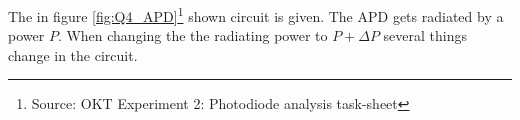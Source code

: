 %
% 
%
%
%
%
%
%
%
%
%
%
%
%

The in figure \ref{fig:Q4_APD}\footnote[1]{Source: OKT Experiment 2: Photodiode analysis task-sheet} shown circuit is given.
The APD gets radiated by a power $P$. 
When changing the the radiating power to $P + \Delta P$ several things change in the circuit.

